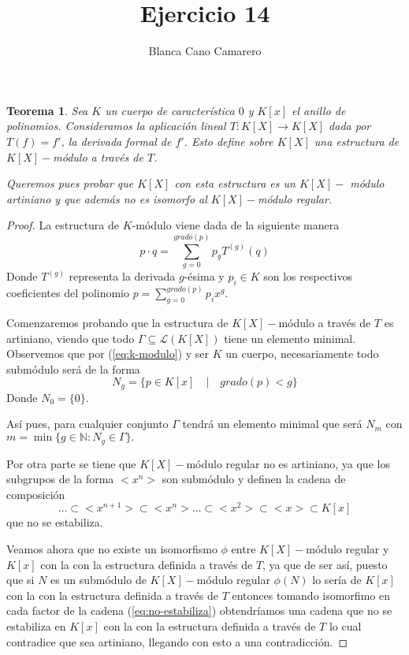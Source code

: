 \documentclass{article}
\title{Ejercicio 14}
\author{Blanca Cano Camarero}
\newtheorem*{teorema*}{Teorema}
\newcommand{\N}{\mathbb{N}}
\begin{document}
\maketitle

\begin{teorema*}
    Sea $K$ un cuerpo de característica $0$ y $K[x]$ el anillo de polinomios. Consideramos la aplicación lineal $T: K[X] \longrightarrow K[X]$ 
    dada por $T(f) = f'$, 
    la derivada formal de $f'$.
    Esto define sobre $K[X]$ una estructura de $K[X]-$módulo a través de $T$. 

    Queremos pues probar que $K[X]$ con esta estructura es un $K[X]-$ módulo artiniano y que además no es isomorfo al $K[X]-$módulo regular.
\end{teorema*}   

\begin{proof}

    La estructura de $K$-módulo viene dada de la siguiente manera 
    \begin{equation}\label{eq:k-modulo}
        p \cdot q = \sum^{grado(p)}_{g = 0} p_g T^{(g)}(q)
    \end{equation}
    Donde $T^{(g)}$ representa la derivada $g$-ésima y $p_i \in K$ son los respectivos coeficientes del polinomio $p = \sum^{grado(p)}_{g = 0} p_i x^g$. 

    Comenzaremos probando que la estructura de $K[X]-$módulo a través de $T$ es artiniano, viendo que todo 
    $\Gamma \subseteq \mathcal{L}(K[X])$ tiene un elemento minimal.
    Observemos que por (\ref{eq:k-modulo}) y ser $K$ un cuerpo, necesariamente todo submódulo será de la forma 
    \begin{equation}
        N_g = 
        \{
            p \in K[x] \quad |  \quad grado(p) < g
        \}
    \end{equation}
    Donde $N_0 = \{0\}$. 

    Así pues, para cualquier conjunto $\Gamma$ tendrá un elemento minimal que será $N_m$ con $m = \min\{ g \in \N : N_g \in \Gamma\}.$


    Por otra parte se tiene que 
    $K[X]-$módulo regular no es artiniano, ya que los subgrupos de la forma 
    $<x^n>$ son submódulo y definen la cadena de composición 
    \begin{equation} \label{eq:no-estabiliza}
        \ldots \subset <x^{n+1}>
        \subset <x^{n}>
        \ldots 
        \subset <x^{2}>
        \subset <x>
        \subset K[x]
    \end{equation}
    que no se estabiliza. 

    Veamos ahora que no existe un isomorfismo $\phi$ entre  $K[X]-$módulo regular 
    y $K[x]$ con la con la estructura definida a través de $T$, ya que de ser así, puesto que si $N$ es un submódulo de 
    $K[X]-$módulo regular $\phi(N)$ lo sería de  $K[x]$ con la con la estructura definida a través de $T$ 
    entonces tomando isomorfimo en cada factor de la cadena (\ref{eq:no-estabiliza}) obtendríamos una cadena que no se estabiliza en $K[x]$ con la con la estructura definida a través de $T$ lo cual contradice que sea artiniano, llegando con esto a una contradicción.


\end{proof}
\end{document}

